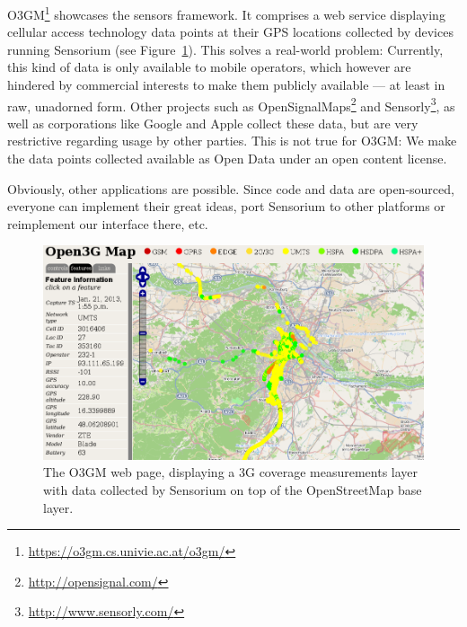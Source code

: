\gls{O3GM}\footnote{\url{https://o3gm.cs.univie.ac.at/o3gm/}} showcases the sensors framework. It comprises a web service displaying cellular access technology data points at their \gls{GPS} locations collected by devices running Sensorium (see Figure~\ref{c5:fig:ogggm}). This solves a real-world problem: Currently, this kind of data is only available to mobile operators, which however  are hindered by commercial interests to make them publicly available --- at least in raw, unadorned form. Other projects such as OpenSignalMaps\footnote{\url{http://opensignal.com/}} and Sensorly\footnote{\url{http://www.sensorly.com/}}, as well as corporations like Google and Apple collect these data, but are very restrictive regarding usage by other parties. This is not true for \gls{O3GM}: We make the data points collected available as Open Data under an open content license.

Obviously, other applications are possible. Since code and data are open-sourced, everyone can implement their great ideas, port Sensorium to other platforms or reimplement our interface there, etc.

\begin{figure}[htb]
\centering
\includegraphics[width=\textwidth]{images/o3gm.png}
\caption{The \gls{O3GM} web page, displaying a \gls{3G} coverage measurements layer with data collected by Sensorium on top of the OpenStreetMap base layer.}
\label{c5:fig:ogggm}
\end{figure}


